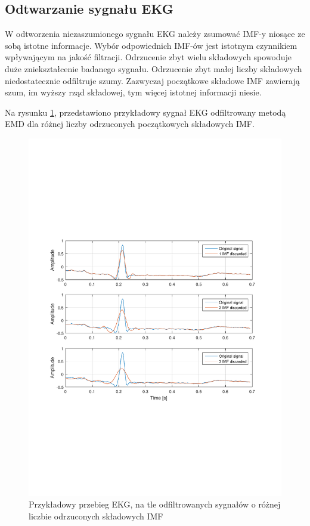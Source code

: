\newpage

\subsection{Odtwarzanie sygnału EKG}
\indent

W odtworzenia niezaszumionego sygnału EKG należy zsumować IMF-y niosące ze sobą
istotne informacje. Wybór odpowiednich IMF-ów jest istotnym czynnikiem
wpływającym na jakość filtracji. Odrzucenie zbyt wielu składowych spowoduje duże
zniekształcenie badanego sygnału. Odrzucenie zbyt małej liczby składowych
niedostatecznie odfiltruje szumy. Zazwyczaj początkowe składowe IMF zawierają
szum, im wyższy rząd składowej, tym więcej istotnej informacji niesie.

Na rysunku \ref{rys:example_ekg}, przedstawiono przykładowy sygnał EKG
odfiltrowany metodą EMD dla różnej liczby odrzuconych początkowych składowych
IMF.

\begin{figure}[!htb]
    \begin{center}
        \includegraphics[width=14cm,trim=3cm 8cm 3cm 8cm,clip]
        {../img/ka_example.pdf}
    \end{center}
    \caption{Przykładowy przebieg EKG, na tle odfiltrowanych sygnałów o różnej
    liczbie odrzuconych składowych IMF}
    \label{rys:example_ekg}
\end{figure}


